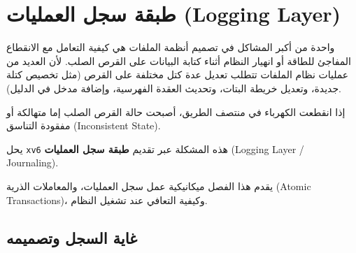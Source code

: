 \chapter{طبقة سجل العمليات (Logging Layer)}
\label{CH:LOG}

واحدة من أكبر المشاكل في تصميم أنظمة الملفات هي كيفية التعامل مع الانقطاع المفاجئ للطاقة أو انهيار النظام أثناء كتابة البيانات على القرص الصلب.
لأن العديد من عمليات نظام الملفات تتطلب تعديل عدة كتل مختلفة على القرص (مثل تخصيص كتلة جديدة، وتعديل خريطة البتات، وتحديث العقدة الفهرسية، وإضافة مدخل في الدليل).

إذا انقطعت الكهرباء في منتصف الطريق، أصبحت حالة القرص الصلب إما متهالكة أو مفقودة التناسق (Inconsistent State).

يحل \texttt{xv6} هذه المشكلة عبر تقديم \textbf{طبقة سجل العمليات} (Logging Layer / Journaling).

يقدم هذا الفصل ميكانيكية عمل سجل العمليات، والمعاملات الذرية (Atomic Transactions)، وكيفية التعافي عند تشغيل النظام.

\section{غاية السجل وتصميمه}
\label{sec:log_design}

